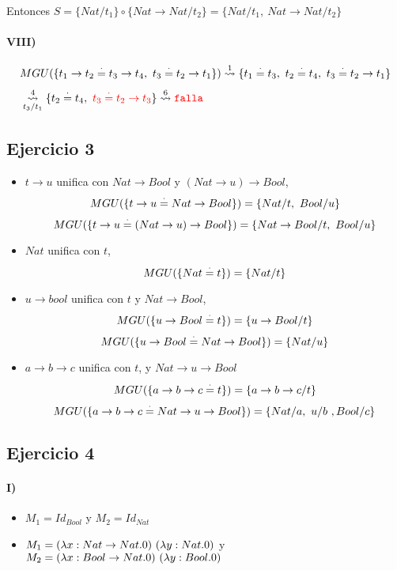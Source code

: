 \documentclass[10pt,a4paper]{article}
\begin{document}
Entonces $S = \{Nat/t_1\} \circ \{Nat\to Nat/t_2\} = \{Nat/t_1,~Nat\to Nat/t_2\}$

\paragraph{VIII)}
\begin{align*}
&MGU(\{t_1\to t_2\equalDot t_3\to t_4, ~t_3\equalDot t_2\to t_1\}) \goesTo{1}{} \{t_1\equalDot t_3,~ t_2\equalDot t_4, ~t_3\equalDot t_2\to t_1\} \\
&\goesTo{4}{t_3/t_1} \{t_2\equalDot t_4, ~\red{t_3\equalDot t_2\to t_3}\} \goesTo{6}{} \falla\\
\end{align*}

\subsection{Ejercicio 3}

\begin{itemize}
\item $t\to u$ unifica con $Nat\to Bool$ y $(Nat\to u)\to Bool$,
    $$MGU(\{t\to u \equalDot Nat\to Bool\}) = \{Nat/t,~Bool/u\}$$
    $$MGU(\{t\to u \equalDot (Nat\to u)\to Bool\}) = \{Nat\to Bool/t,~Bool/u\}$$
\item $Nat$ unifica con $t$,
    $$MGU(\{Nat \equalDot t\}) = \{Nat/t\}$$
\item $u\to bool$ unifica con $t$ y $Nat\to Bool$, 
    $$MGU(\{u\to Bool \equalDot t\}) = \{u\to Bool/t\}$$
    $$MGU(\{u\to Bool \equalDot Nat\to Bool\}) = \{Nat/u\}$$
\item $a\to b \to c$ unifica con $t$, y $Nat\to u \to Bool$
    $$MGU(\{a\to b \to c \equalDot t\}) = \{a\to b \to c/t\}$$
        $$MGU(\{a\to b \to c \equalDot Nat\to u \to Bool\}) = \{Nat/a,~u/b~, Bool/c\}$$
\end{itemize}

\subsection{Ejercicio 4}
\paragraph{I)}
\begin{itemize}
    \item $M_1 = Id_{Bool}$ y $M_2 = Id_{Nat}$
    \item $M_1 = (\lambdaAbs{x}{Nat\to Nat}{0})~(\lambdaAbs{y}{Nat}{0})$ y $M_2 = (\lambdaAbs{x}{Bool\to Nat}{0})~(\lambdaAbs{y}{Bool}{0})$
\end{itemize}
\end{document}
